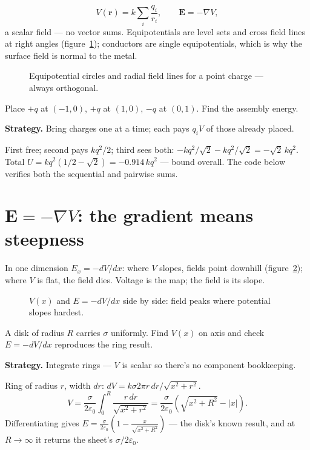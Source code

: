 \begin{equation}
  V(\mathbf r)=k\sum_i\frac{q_i}{r_i},\qquad
  \mathbf E=-\nabla V,\label{eq:v}
\end{equation}
a scalar field --- no vector sums. Equipotentials are level sets and
cross field lines at right angles (figure~\ref{fig:equip}); conductors
are single equipotentials, which is why the surface field is normal to
the metal.

\begin{figure}[htbp]\centering

\caption{Equipotential circles and radial field lines for a point
charge --- always orthogonal.}
\label{fig:equip}
\end{figure}

\begin{example}\label{ex:assemble}
Place $+q$ at $(-1,0)$, $+q$ at $(1,0)$, $-q$ at $(0,1)$. Find the
assembly energy.
\par\smallskip
\textbf{Strategy.} Bring charges one at a time; each pays $q_iV$ of
those already placed.
\begin{solution}
First free; second pays $kq^{2}/2$; third sees both:
$-kq^{2}/\sqrt2-kq^{2}/\sqrt2=-\sqrt2\,kq^{2}$.
Total $U=kq^{2}(1/2-\sqrt2)=-0.914\,kq^{2}$ --- bound overall.
The code below verifies both the sequential and pairwise sums.
\checkmark
\end{solution}
\end{example}

\section{$\mathbf E=-\nabla V$: the gradient means steepness}\label{sec:pot-grad}

In one dimension $E_x=-dV/dx$: where $V$ slopes, fields point downhill
(figure~\ref{fig:vx}); where $V$ is flat, the field dies. Voltage is
the map; the field is its slope.

\begin{figure}[htbp]\centering

\caption{$V(x)$ and $E=-dV/dx$ side by side: field peaks where potential
slopes hardest.}
\label{fig:vx}
\end{figure}

\begin{example}\label{ex:disk}
A disk of radius $R$ carries $\sigma$ uniformly. Find $V(x)$ on axis
and check $E=-dV/dx$ reproduces the ring result.
\par\smallskip
\textbf{Strategy.} Integrate rings --- $V$ is scalar so there's no
component bookkeeping.
\begin{solution}
Ring of radius $r$, width $dr$: $dV=k\sigma2\pi r\,dr/\sqrt{x^{2}+r^{2}}$.
\[V=\frac{\sigma}{2\varepsilon_0}\int_0^{R}\frac{r\,dr}{\sqrt{x^{2}+r^{2}}}
=\frac{\sigma}{2\varepsilon_0}\left(\sqrt{x^{2}+R^{2}}-|x|\right).\]
Differentiating gives
$E=\frac{\sigma}{2\varepsilon_0}\left(1-\frac{x}{\sqrt{x^{2}+R^{2}}}\right)$
--- the disk's known result, and at $R\to\infty$ it returns the sheet's
$\sigma/2\varepsilon_0$. \checkmark
\end{solution}
\end{example}

